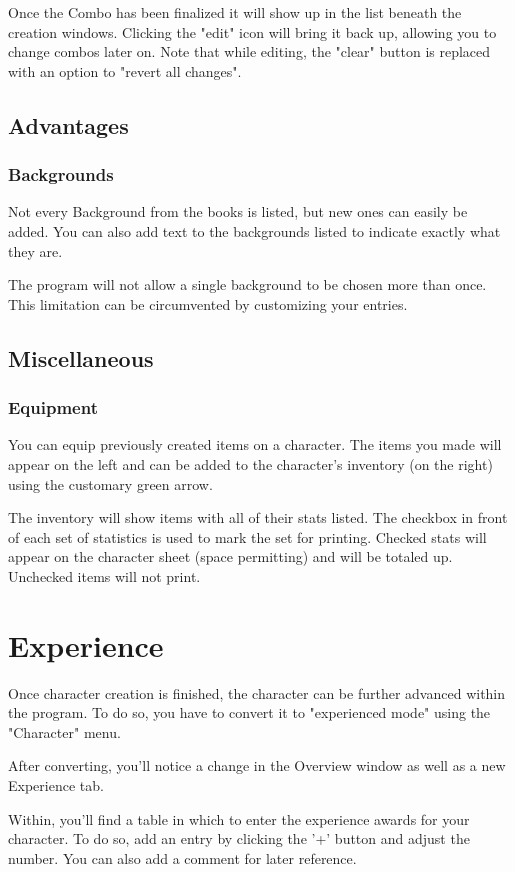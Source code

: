 Once the Combo has been finalized it will show up in the list beneath the creation windows. Clicking the  "edit" icon will bring it back up, allowing you to change combos later on. Note that while editing, the "clear" button is replaced with an option to "revert all changes".

\subsection{Advantages}
\subsubsection{Backgrounds}
Not every Background from the books is listed, but new ones can easily be added. You can also add text to the backgrounds listed to indicate exactly what they are. 

The program will not allow a single background to be chosen more than once. This limitation can be circumvented by customizing your entries.

\subsection{Miscellaneous}
\subsubsection{Equipment}
You can equip previously created items on a character. The items you made will appear on the left and can be added to the character's inventory (on the right) using the customary green arrow. 

The inventory will show items with all of their stats listed. The checkbox in front of each set of statistics is used to mark the set for printing. Checked stats will appear on the character sheet (space permitting) and will be totaled up.  Unchecked items will not print.

\section{Experience}
Once character creation is finished, the character can be further advanced within the program. To do so, you have to convert it to "experienced mode" using the "Character" menu.
 
After converting, you'll notice a change in the Overview window as well as a new Experience tab.

Within, you'll find a table in which to enter the experience awards for your character.  To do so, add an entry by clicking the '+' button and adjust the number. You can also add a comment for later reference.

